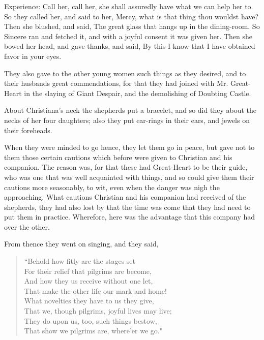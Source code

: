 Experience: Call her, call her, she shall assuredly have what we can help her to. So they called her, and said to her, Mercy, what is that thing thou wouldst have? Then she blushed, and said, The great glass that hangs up in the dining-room. So Sincere ran and fetched it, and with a joyful consent it was given her. Then she bowed her head, and gave thanks, and said, By this I know that I have obtained favor in your eyes.

They also gave to the other young women such things as they desired, and to their husbands great commendations, for that they had joined with Mr. Great-Heart in the slaying of Giant Despair, and the demolishing of Doubting Castle.

About Christiana's neck the shepherds put a bracelet, and so did they about the necks of her four daughters; also they put ear-rings in their ears, and jewels on their foreheads.

When they were minded to go hence, they let them go in peace, but gave not to them those certain cautions which before were given to Christian and his companion. The reason was, for that these had Great-Heart to be their guide, who was one that was well acquainted with things, and so could give them their cautions more seasonably, to wit, even when the danger was nigh the approaching. What cautions Christian and his companion had received of the shepherds, they had also lost by that the time was come that they had need to put them in practice. Wherefore, here was the advantage that this company had over the other.

From thence they went on singing, and they said,
\begin{verse}
 ``Behold how fitly are the stages set\\
For their relief that pilgrims are become,\\
And how they us receive without one let,\\
That make the other life our mark and home!\\
 What novelties they have to us they give,\\
That we, though pilgrims, joyful lives may live;\\
They do upon us, too, such things bestow,\\
That show we pilgrims are, where'er we go."\\
\end{verse}
